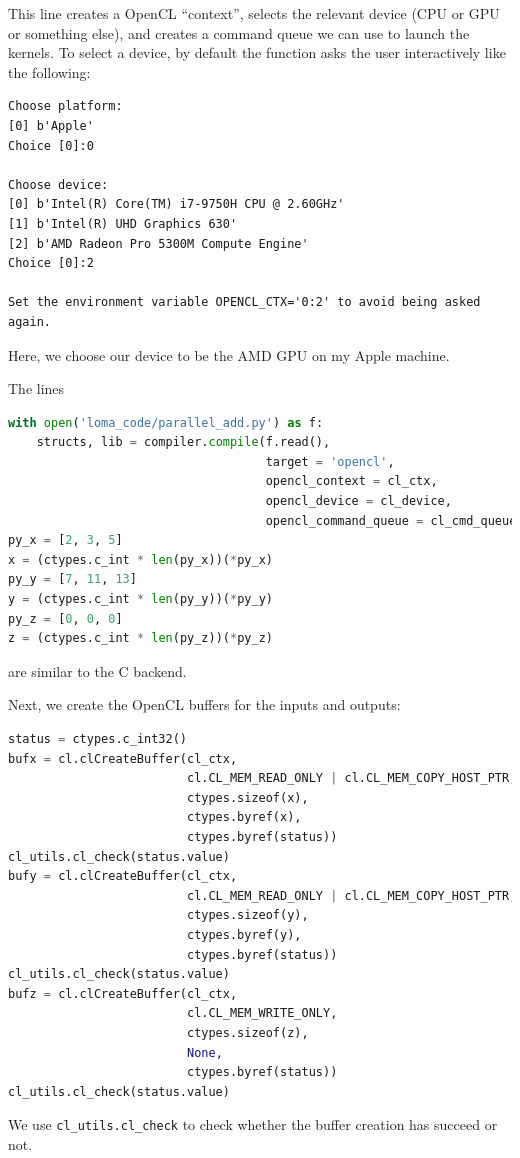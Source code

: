 This line creates a OpenCL ``context'', selects the relevant device (CPU or GPU or something else), and creates a command queue we can use to launch the kernels. To select a device, by default the function asks the user interactively like the following:
\begin{lstlisting}
Choose platform:
[0] b'Apple'
Choice [0]:0

Choose device:
[0] b'Intel(R) Core(TM) i7-9750H CPU @ 2.60GHz'
[1] b'Intel(R) UHD Graphics 630'
[2] b'AMD Radeon Pro 5300M Compute Engine'
Choice [0]:2

Set the environment variable OPENCL_CTX='0:2' to avoid being asked again.
\end{lstlisting}
Here, we choose our device to be the AMD GPU on my Apple machine.

The lines 
\begin{lstlisting}[language=python]
with open('loma_code/parallel_add.py') as f:
    structs, lib = compiler.compile(f.read(),
                                    target = 'opencl',
                                    opencl_context = cl_ctx,
                                    opencl_device = cl_device,
                                    opencl_command_queue = cl_cmd_queue)
py_x = [2, 3, 5]
x = (ctypes.c_int * len(py_x))(*py_x)
py_y = [7, 11, 13]
y = (ctypes.c_int * len(py_y))(*py_y)
py_z = [0, 0, 0]
z = (ctypes.c_int * len(py_z))(*py_z)
\end{lstlisting}
are similar to the C backend.

Next, we create the OpenCL buffers for the inputs and outputs:
\begin{lstlisting}[language=python]
status = ctypes.c_int32()
bufx = cl.clCreateBuffer(cl_ctx,
                         cl.CL_MEM_READ_ONLY | cl.CL_MEM_COPY_HOST_PTR,
                         ctypes.sizeof(x),
                         ctypes.byref(x),
                         ctypes.byref(status))
cl_utils.cl_check(status.value)
bufy = cl.clCreateBuffer(cl_ctx,
                         cl.CL_MEM_READ_ONLY | cl.CL_MEM_COPY_HOST_PTR,
                         ctypes.sizeof(y),
                         ctypes.byref(y),
                         ctypes.byref(status))
cl_utils.cl_check(status.value)
bufz = cl.clCreateBuffer(cl_ctx,
                         cl.CL_MEM_WRITE_ONLY,
                         ctypes.sizeof(z),
                         None,
                         ctypes.byref(status))
cl_utils.cl_check(status.value)
\end{lstlisting}
We use \lstinline{cl_utils.cl_check} to check whether the buffer creation has succeed or not.

